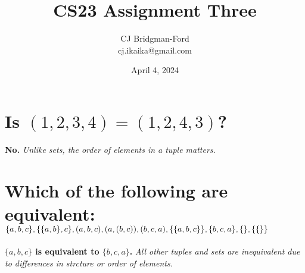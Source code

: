 \documentclass{article}
\title{CS23 Assignment Three}
\author{CJ Bridgman-Ford \\ cj.ikaika@gmail.com}
\date{April 4, 2024}
\begin{document}
\maketitle
\thispagestyle{empty}


\clearpage

\section{Is $(1, 2, 3, 4) = (1, 2, 4, 3)$?}
\hspace{1cm}\textbf{No.}\textit{ Unlike sets, the order of elements in a tuple matters.}

\section{Which of the following are equivalent: \\
    $\{a, b, c\}, \{\{a, b\}, c\}, (a, b, c), (a, (b, c)), (b, c, a),
    \\ \{\{a, b, c\}\}, \{b, c, a\}, \{\}, \{\{\}\}$}
\hspace{1cm}\textbf{$\{a, b, c\}$ is equivalent to $\{b, c, a\}$.}\textit{
    All other tuples and sets are inequivalent due to differences in strcture
    or order of elements.}

\end{document}
